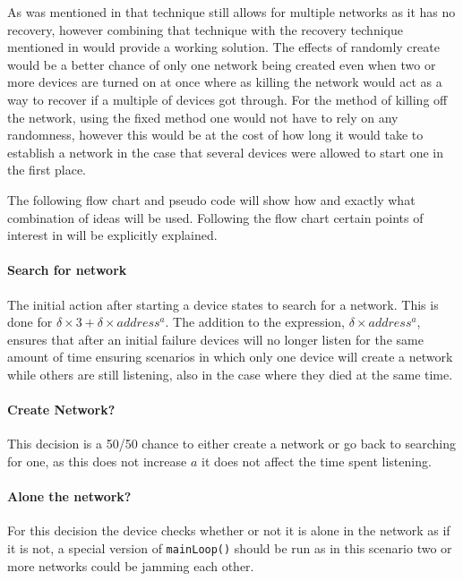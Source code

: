 \bigskip \noindent
As was mentioned in  that technique still allows for multiple networks as it has no recovery, however combining that technique with the recovery technique mentioned in  would provide a working solution.
The effects of randomly create would be a better chance of only one network being created even when two or more devices are turned on at once where as killing the network would act as a way to recover if a multiple of devices got through.
For the method of killing off the network, using the fixed method one would not have to rely on any randomness, however this would be at the cost of how long it would take to establish a network in the case that several devices were allowed to start one in the first place.

The following flow chart and pseudo code will show how and exactly what combination of ideas will be used.
Following the flow chart certain points of interest in  will be explicitly explained.

\paragraph{Search for network}
The initial action after starting a device states to search for a network.
This is done for $\delta \times 3 + \delta \times address^a$. 
The addition to the expression, $\delta \times address^a$, ensures that after an initial failure devices will no longer listen for the same amount of time ensuring scenarios in which only one device will create a network while others are still listening, also in the case where they died at the same time.
\paragraph{Create Network?}
This decision is a 50/50 chance to either create a network or go back to searching for one, as this does not increase $a$ it does not affect the time spent listening.
\paragraph{Alone the network?}
For this decision the device checks whether or not it is alone in the network as if it is not, a special version of \texttt{mainLoop()} should be run as in this scenario two or more networks could be jamming each other.